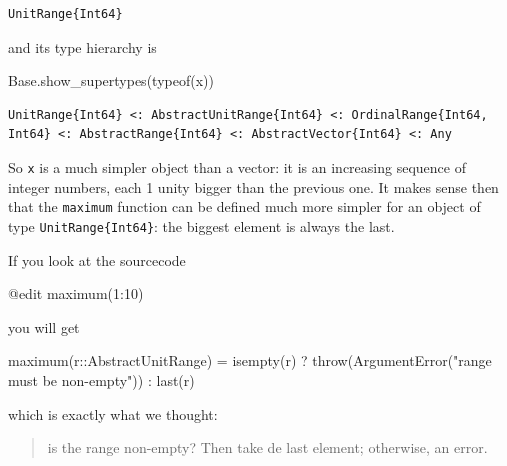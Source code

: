 \documentclass[
  letterpaper,
  DIV=11,
  numbers=noendperiod]{scrartcl}
\newenvironment{Shaded}{\begin{snugshade}}{\end{snugshade}}
\newcommand{\BuiltInTok}[1]{\textcolor[rgb]{0.00,0.23,0.31}{#1}}
\newcommand{\DataTypeTok}[1]{\textcolor[rgb]{0.68,0.00,0.00}{#1}}
\newcommand{\FloatTok}[1]{\textcolor[rgb]{0.68,0.00,0.00}{#1}}
\newcommand{\FunctionTok}[1]{\textcolor[rgb]{0.28,0.35,0.67}{#1}}
\newcommand{\NormalTok}[1]{\textcolor[rgb]{0.00,0.23,0.31}{#1}}
\newcommand{\OperatorTok}[1]{\textcolor[rgb]{0.37,0.37,0.37}{#1}}
\newcommand{\PreprocessorTok}[1]{\textcolor[rgb]{0.68,0.00,0.00}{#1}}
\newcommand{\StringTok}[1]{\textcolor[rgb]{0.13,0.47,0.30}{#1}}
\begin{document}
\begin{verbatim}
UnitRange{Int64}
\end{verbatim}

and its type hierarchy is

\begin{Shaded}
\begin{Highlighting}[]
\BuiltInTok{Base}\NormalTok{.}\FunctionTok{show\_supertypes}\NormalTok{(}\FunctionTok{typeof}\NormalTok{(x))}
\end{Highlighting}
\end{Shaded}

\begin{verbatim}
UnitRange{Int64} <: AbstractUnitRange{Int64} <: OrdinalRange{Int64, Int64} <: AbstractRange{Int64} <: AbstractVector{Int64} <: Any
\end{verbatim}

So \texttt{x} is a much simpler object than a vector: it is an
increasing sequence of integer numbers, each 1 unity bigger than the
previous one. It makes sense then that the \texttt{maximum} function can
be defined much more simpler for an object of type
\texttt{UnitRange\{Int64\}}: the biggest element is always the last.

If you look at the sourcecode

\begin{Shaded}
\begin{Highlighting}[]
\PreprocessorTok{@edit} \FunctionTok{maximum}\NormalTok{(}\FloatTok{1}\OperatorTok{:}\FloatTok{10}\NormalTok{)}
\end{Highlighting}
\end{Shaded}

you will get

\begin{Shaded}
\begin{Highlighting}[]
\FunctionTok{maximum}\NormalTok{(r}\OperatorTok{::}\DataTypeTok{AbstractUnitRange}\NormalTok{) }\OperatorTok{=} \FunctionTok{isempty}\NormalTok{(r) ? }\FunctionTok{throw}\NormalTok{(}\FunctionTok{ArgumentError}\NormalTok{(}\StringTok{"range must be non{-}empty"}\NormalTok{)) }\OperatorTok{:} \FunctionTok{last}\NormalTok{(r)}
\end{Highlighting}
\end{Shaded}

which is exactly what we thought:

\begin{quote}
is the range non-empty? Then take de last element; otherwise, an error.
\end{quote}
\end{document}
